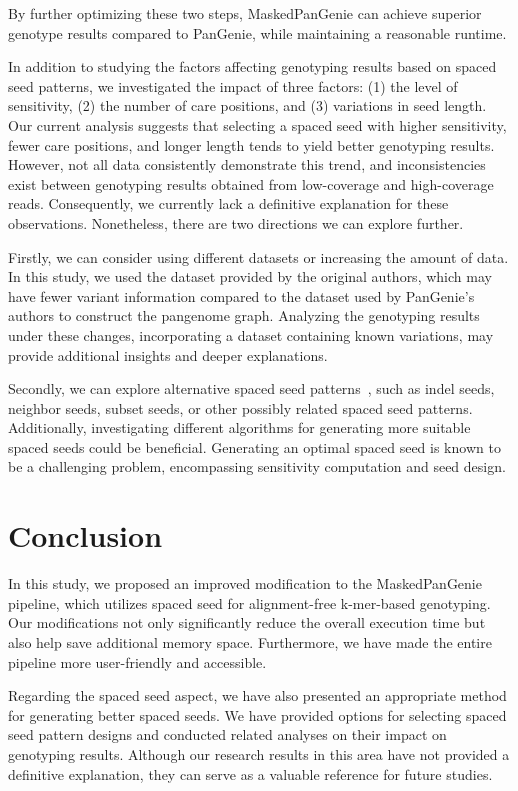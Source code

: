 \documentclass{PHlab-thesis}
\begin{document}
By further optimizing these two steps, MaskedPanGenie can achieve superior genotype results compared to PanGenie, while maintaining a reasonable runtime.

In addition to studying the factors affecting genotyping results based on spaced seed patterns, we investigated the impact of three factors: (1) the level of sensitivity, (2) the number of care positions, and (3) variations in seed length. Our current analysis suggests that selecting a spaced seed with higher sensitivity, fewer care positions, and longer length tends to yield better genotyping results. However, not all data consistently demonstrate this trend, and inconsistencies exist between genotyping results obtained from low-coverage and high-coverage reads. Consequently, we currently lack a definitive explanation for these observations. Nonetheless, there are two directions we can explore further.

Firstly, we can consider using different datasets or increasing the amount of data. In this study, we used the dataset provided by the original authors, which may have fewer variant information compared to the dataset used by PanGenie's authors to construct the pangenome graph. Analyzing the genotyping results under these changes, incorporating a dataset containing known variations, may provide additional insights and deeper explanations.

Secondly, we can explore alternative spaced seed patterns~\cite{Noe2017SeedSelection}, such as indel seeds, neighbor seeds, subset seeds, or other possibly related spaced seed patterns. Additionally, investigating different algorithms for generating more suitable spaced seeds could be beneficial. Generating an optimal spaced seed is known to be a challenging problem, encompassing sensitivity computation and seed design.

\chapter{Conclusion}
In this study, we proposed an improved modification to the MaskedPanGenie pipeline, which utilizes spaced seed for alignment-free k-mer-based genotyping. Our modifications not only significantly reduce the overall execution time but also help save additional memory space. Furthermore, we have made the entire pipeline more user-friendly and accessible.

Regarding the spaced seed aspect, we have also presented an appropriate method for generating better spaced seeds. We have provided options for selecting spaced seed pattern designs and conducted related analyses on their impact on genotyping results. Although our research results in this area have not provided a definitive explanation, they can serve as a valuable reference for future studies.
\newpage
{}
\printbibliography
\end{document}
